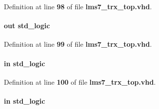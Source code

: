 Definition at line {\bf 98} of file {\bf lms7\+\_\+trx\+\_\+top.\+vhd}.

\paragraph[{F\+X3\+\_\+\+C\+T\+L3}]{ {\bfseries \textcolor{keywordflow}{out}\textcolor{vhdlchar}{ }} {\bfseries \textcolor{comment}{std\+\_\+logic}\textcolor{vhdlchar}{ }} \hspace{0.3cm}{\ttfamily [Port]}}\label{classlms7__trx__top_aaeee1cda563316b44a387622c62d6803}


Definition at line {\bf 99} of file {\bf lms7\+\_\+trx\+\_\+top.\+vhd}.

\paragraph[{F\+X3\+\_\+\+C\+T\+L4}]{ {\bfseries \textcolor{keywordflow}{in}\textcolor{vhdlchar}{ }} {\bfseries \textcolor{comment}{std\+\_\+logic}\textcolor{vhdlchar}{ }} \hspace{0.3cm}{\ttfamily [Port]}}\label{classlms7__trx__top_a1a52bf75046bd6a5475a2a88d151ddb5}


Definition at line {\bf 100} of file {\bf lms7\+\_\+trx\+\_\+top.\+vhd}.

\paragraph[{F\+X3\+\_\+\+C\+T\+L5}]{ {\bfseries \textcolor{keywordflow}{in}\textcolor{vhdlchar}{ }} {\bfseries \textcolor{comment}{std\+\_\+logic}\textcolor{vhdlchar}{ }} \hspace{0.3cm}{\ttfamily [Port]}}\label{classlms7__trx__top_a3f2ca183fc4d863b11b70fb8af3bcaac}


